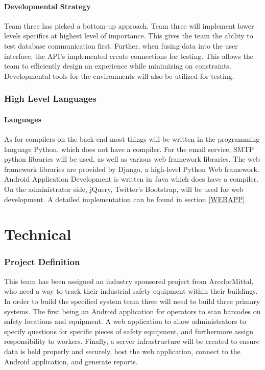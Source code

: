 \documentclass[Letter,11pt]{article}
\begin{document}
	\subsection{Developmental Strategy}
	Team three has picked a bottom-up approach. Team three will implement lower levels specifics at highest level of importance. This gives the team the ability to test database communication first. Further, when fusing data into the user interface, the API's implemented create connections for testing. This allows the team to efficiently design an experience while minimizing on constraints. Developmental tools for the environments will also be utilized for testing. \\ 

\section{High Level Languages}\label{highlevel}
	\subsection{Languages}
	As for compilers on the back-end most things will be written in the programming language Python, which does not have a compiler. For the email service, SMTP python libraries will be used, as well as various web framework libraries. The web framework libraries are provided by Django, a high-level Python Web framework. \\
	Android Application Development is written in Java which does have a compiler. On the administrator side, jQuery, Twitter's Bootstrap, will be used for web development.  A detailed implementation can be found in section \ref{WEBAPP}.  \\ 


\part{Technical}
\section{Project Definition}\label{def}
	This team has been assigned an industry sponsored project from ArcelorMittal, who need a way to track their industrial safety equipment within their buildings. In order to build the specified system team three will need to build three primary systems. The first being an Android application for operators to scan barcodes on safety locations and equipment. A web application to allow administrators to specify questions for specific pieces of safety equipment, and furthermore assign responsibility to workers. Finally, a server infrastructure will be created to ensure data is held properly and securely, host the web application, connect to the Android application, and generate reports. 
			
\end{document}
